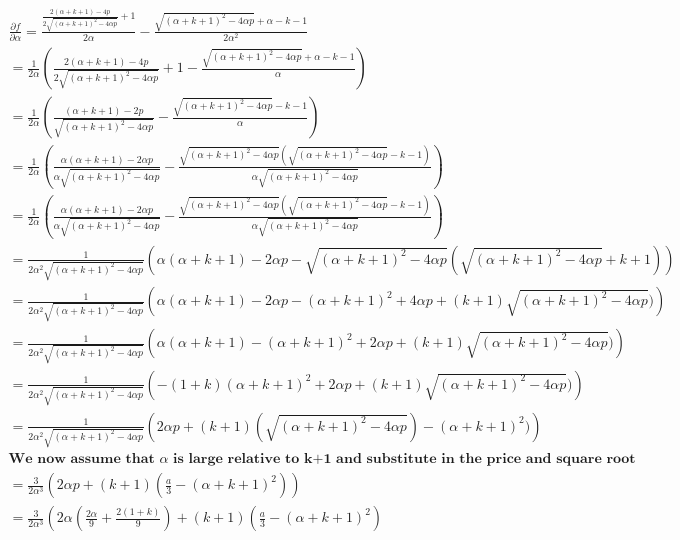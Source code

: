 \documentclass[11pt]{article}
\begin{document}
\begin{align*}
\frac{\partial f}{\partial \alpha} = \frac{\frac{2 (\alpha+k+1)-4 p}{2 \sqrt{(\alpha+k+1)^2-4 \alpha p}}+1}{2
   \alpha}-\frac{\sqrt{(\alpha+k+1)^2-4 \alpha p}+\alpha-k-1}{2 \alpha^2} \\
=\frac{1}{2 \alpha}
\left( 
\frac{2 (\alpha+k+1)-4 p}{2 \sqrt{(\alpha+k+1)^2-4 \alpha p}}+1-\frac{\sqrt{(\alpha+k+1)^2-4 \alpha p}+\alpha-k-1}{ \alpha}
\right) \\
=\frac{1}{2 \alpha}
\left( 
\frac{ (\alpha+k+1)-2 p}{ \sqrt{(\alpha+k+1)^2-4 \alpha p}}-\frac{\sqrt{(\alpha+k+1)^2-4 \alpha p}-k-1}{ \alpha}
\right) \\
=\frac{1}{2 \alpha}
\left( 
\frac{ \alpha (\alpha+k+1)-2 \alpha p}{ \alpha\sqrt{(\alpha+k+1)^2-4 \alpha p}}-\frac{\sqrt{(\alpha+k+1)^2-4 \alpha p}(\sqrt{(\alpha+k+1)^2-4 \alpha p}-k-1)}{ \alpha\sqrt{(\alpha+k+1)^2-4 \alpha p}}
\right) \\
=\frac{1}{2 \alpha}
\left( 
\frac{ \alpha (\alpha+k+1)-2 \alpha p}{ \alpha\sqrt{(\alpha+k+1)^2-4 \alpha p}}-\frac{\sqrt{(\alpha+k+1)^2-4 \alpha p}(\sqrt{(\alpha+k+1)^2-4 \alpha p}-k-1)}{ \alpha\sqrt{(\alpha+k+1)^2-4 \alpha p}}
\right) \\
=\frac{1}{2 \alpha^2 \sqrt{(\alpha+k+1)^2-4 \alpha p}}
\left( 
\alpha (\alpha+k+1)-2 \alpha p-\sqrt{(\alpha+k+1)^2-4 \alpha p}(\sqrt{(\alpha+k+1)^2-4 \alpha p}+k+1)
\right) \\
=\frac{1}{2 \alpha^2 \sqrt{(\alpha+k+1)^2-4 \alpha p}}
\left( 
\alpha (\alpha+k+1)-2 \alpha p-(\alpha+k+1)^2+4 \alpha p+(k+1)\sqrt{(\alpha+k+1)^2-4 \alpha p})
\right) \\
=\frac{1}{2 \alpha^2 \sqrt{(\alpha+k+1)^2-4 \alpha p}}
\left( 
\alpha (\alpha+k+1)-(\alpha+k+1)^2+2 \alpha p+(k+1)\sqrt{(\alpha+k+1)^2-4 \alpha p})
\right) \\
=\frac{1}{2 \alpha^2 \sqrt{(\alpha+k+1)^2-4 \alpha p}}
\left( 
-(1+k)(\alpha+k+1)^2+2 \alpha p+(k+1)\sqrt{(\alpha+k+1)^2-4 \alpha p})
\right) \\
=\frac{1}{2 \alpha^2 \sqrt{(\alpha+k+1)^2-4 \alpha p}}
\left( 
2 \alpha p+(k+1)(\sqrt{(\alpha+k+1)^2-4 \alpha p})-(\alpha+k+1)^2)
\right) \\
\textbf{We now assume that $\alpha$ is large relative to k+1 and substitute in the price and square root}
\\
=\frac{3}{2 \alpha^3 }
\left( 
2 \alpha p+(k+1)(\frac{a}{3}-(\alpha+k+1)^2)
\right) \\
=\frac{3}{2 \alpha^3 }
\left( 
2 \alpha (\frac{2\alpha}{9}+\frac{2(1+k)}{9})+(k+1)(\frac{a}{3}-(\alpha+k+1)^2)

\end{align*}
\end{document}
